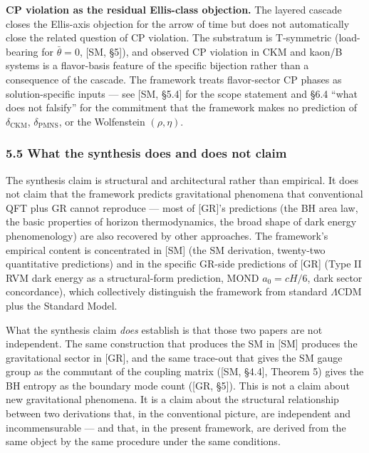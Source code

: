 \documentclass[
]{article}
\begin{document}
\textbf{CP violation as the residual Ellis-class objection.} The layered
cascade closes the Ellis-axis objection for the arrow of time but does
not automatically close the related question of CP violation. The
substratum is T-symmetric (load-bearing for \(\bar\theta = 0\), {[}SM,
§5{]}), and observed CP violation in CKM and kaon/B systems is a
flavor-basis feature of the specific bijection rather than a consequence
of the cascade. The framework treats flavor-sector CP phases as
solution-specific inputs --- see {[}SM, §5.4{]} for the scope statement
and §6.4 ``what does not falsify'' for the commitment that the framework
makes no prediction of \(\delta_{\text{CKM}}\),
\(\delta_{\text{PMNS}}\), or the Wolfenstein \((\rho, \eta)\).

\hypertarget{what-the-synthesis-does-and-does-not-claim}{%
\subsubsection{5.5 What the synthesis does and does not
claim}\label{what-the-synthesis-does-and-does-not-claim}}

The synthesis claim is structural and architectural rather than
empirical. It does not claim that the framework predicts gravitational
phenomena that conventional QFT plus GR cannot reproduce --- most of
{[}GR{]}'s predictions (the BH area law, the basic properties of horizon
thermodynamics, the broad shape of dark energy phenomenology) are also
recovered by other approaches. The framework's empirical content is
concentrated in {[}SM{]} (the SM derivation, twenty-two quantitative
predictions) and in the specific GR-side predictions of {[}GR{]} (Type
II RVM dark energy as a structural-form prediction, MOND \(a_0 = cH/6\),
dark sector concordance), which collectively distinguish the framework
from standard \(\Lambda\)CDM plus the Standard Model.

What the synthesis claim \emph{does} establish is that those two papers
are not independent. The same construction that produces the SM in
{[}SM{]} produces the gravitational sector in {[}GR{]}, and the same
trace-out that gives the SM gauge group as the commutant of the coupling
matrix ({[}SM, §4.4{]}, Theorem 5) gives the BH entropy as the boundary
mode count ({[}GR, §5{]}). This is not a claim about new gravitational
phenomena. It is a claim about the structural relationship between two
derivations that, in the conventional picture, are independent and
incommensurable --- and that, in the present framework, are derived from
the same object by the same procedure under the same conditions.
\end{document}
